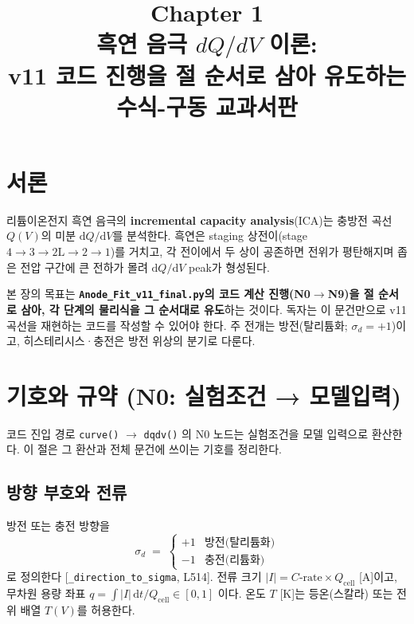 \documentclass[11pt,a4paper]{article}
\title{\textbf{\LARGE Chapter 1}\\[0.35em]
  \Large 흑연 음극 $dQ/dV$ 이론:\\[0.2em]
  v11 코드 진행을 절 순서로 삼아 유도하는 수식-구동 교과서판}
\author{}
\date{}
\newcommand{\dd}{\mathrm{d}}
\newcommand{\cell}{\mathrm{cell}}
\begin{document}
\maketitle

\section*{서론}
리튬이온전지 흑연 음극의 \textbf{incremental capacity analysis}(ICA)는
충방전 곡선 $Q(V)$의 미분 $\dd Q/\dd V$를 분석한다.
흑연은 staging 상전이(stage $4\!\to\!3\!\to\!2\mathrm{L}\!\to\!2\!\to\!1$)를 거치고,
각 전이에서 두 상이 공존하면 전위가 평탄해지며 좁은 전압 구간에 큰 전하가 몰려
$\dd Q/\dd V$ peak가 형성된다.

본 장의 목표는 \textbf{\texttt{Anode\_Fit\_v11\_final.py}의 코드 계산 진행(N0$\to$N9)을
절 순서로 삼아, 각 단계의 물리식을 그 순서대로 유도}하는 것이다.
독자는 이 문건만으로 v11 곡선을 재현하는 코드를 작성할 수 있어야 한다.
주 전개는 방전(탈리튬화; $\sigma_d{=}{+}1$)이고, 히스테리시스·충전은
방전 위상의 분기로 다룬다.

\tableofcontents
\newpage

\section{기호와 규약 (N0: 실험조건 → 모델입력)}
\label{sec:notation}
코드 진입 경로 \texttt{curve()} $\to$ \texttt{dqdv()} 의 N0 노드는 실험조건을
모델 입력으로 환산한다. 이 절은 그 환산과 전체 문건에 쓰이는 기호를 정리한다.

\subsection{방향 부호와 전류}
방전 또는 충전 방향을
\begin{equation}
  \sigma_d \;=\; \begin{cases}+1 & \text{방전(탈리튬화)}\\ -1 & \text{충전(리튬화)}\end{cases}
  \label{eq:sigmad}
\end{equation}
로 정의한다 [\texttt{\_direction\_to\_sigma}, L514].
전류 크기 $|I| = C\text{-rate}\times Q_\cell$ [A]이고,
무차원 용량 좌표 $q = \int|I|\,\dd t/Q_\cell \in[0,1]$ 이다.
온도 $T$ [K]는 등온(스칼라) 또는 전위 배열 $T(V)$를 허용한다.
\end{document}
